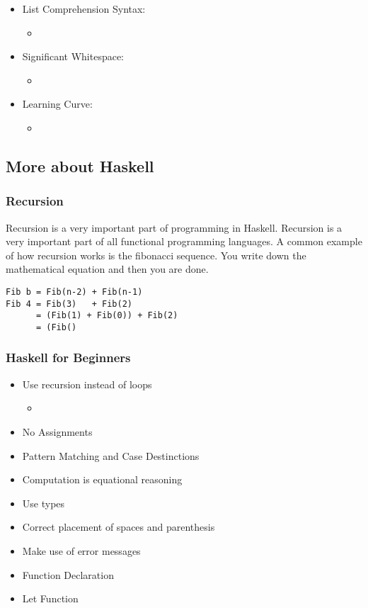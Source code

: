 \documentclass{article}
\begin{document}
\begin{itemize}
  \item List Comprehension Syntax:
  \begin{itemize}
    \item
    \end{itemize}
  \item Significant Whitespace:
    \begin{itemize}
    \item
    \end{itemize}
  \item Learning Curve:
    \begin{itemize}
    \item
    \end{itemize}

\end{itemize}






\subsection{More about Haskell}
\subsubsection{Recursion}
Recursion is a very important part of programming in Haskell. Recursion is a very important part of all functional programming languages. A common example of how recursion works is the fibonacci sequence. You write down the mathematical equation and then you are done.

\begin{lstlisting}
Fib b = Fib(n-2) + Fib(n-1)
Fib 4 = Fib(3)   + Fib(2)
      = (Fib(1) + Fib(0)) + Fib(2)
      = (Fib()
\end{lstlisting}



\subsubsection{Haskell for Beginners}
\begin{itemize}
  \item Use recursion instead of loops
  \begin{itemize}
    \item
    \end{itemize}
  \item No Assignments
  \item Pattern Matching and Case Destinctions
  \item Computation is equational reasoning
  \item Use types
  \item Correct placement of spaces and parenthesis
  \item Make use of error messages
  \item Function Declaration
  \item Let Function
\end{itemize}
\end{document}
